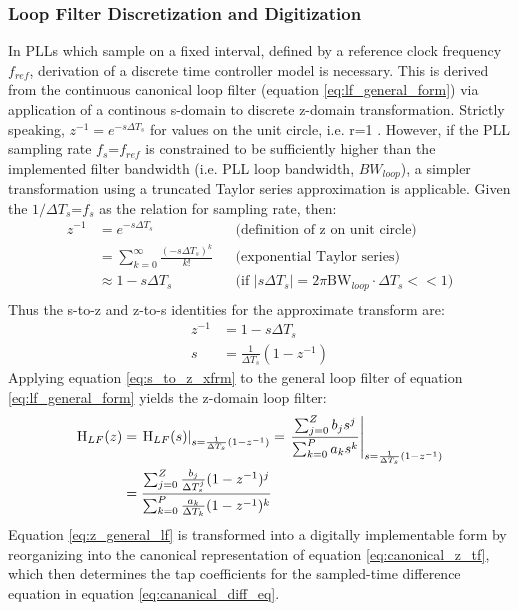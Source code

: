 		\subsubsection{Loop Filter Discretization and Digitization}\label{lf-discretization}
			In PLLs which sample on a fixed interval, defined by a reference clock frequency $f_{ref}$, derivation of a discrete time controller model is necessary. This is derived from the continuous canonical loop filter (equation \ref{eq:lf_general_form}) via application of a continous s-domain to discrete z-domain transformation. Strictly speaking, $z^{-1} = e^{-s\Delta T_s}$ for values on the unit circle, i.e. r=1 \cite{proakis_1993_z}. However, if the PLL sampling rate $f_s$=$f_{ref}$ is constrained to be sufficiently higher than the implemented filter bandwidth (i.e. PLL loop bandwidth, $BW_{loop}$), a simpler transformation using a truncated Taylor series approximation is applicable. Given the $1/\Delta T_s$=$f_{s}$ as the relation for sampling rate, then:
			\begin{align*}
				z^{-1} &= e^{-s\Delta T_s} && \text{(definition of z on unit circle)} \\
				&= \sum_{k=0}^\infty\frac{(-s\Delta T_s)^k}{k!} && \text{(exponential Taylor series)} \\
				&\approx 1-s\Delta T_s &&\text{(if $|s\Delta T_s| = 2\pi\mathrm{BW}_{loop}\cdot \Delta T_s << 1$)} \\
			\end{align*}
			Thus the s-to-z and z-to-s identities for the approximate transform are:
			\begin{align}
				z^{-1} &= 1-s\Delta T_s\\
				s &= \frac{1}{\Delta T_s}(1-z^{-1}) \label{eq:s_to_z_xfrm}
			\end{align}
			Applying equation \ref{eq:s_to_z_xfrm} to the general loop filter of equation \ref{eq:lf_general_form} yields the z-domain loop filter:
			\begin{align}
				\textnormal{H}_{LF}(z) &= \left.\textnormal{H}_{LF}(s)\right\vert_{s=\frac{1}{\Delta T_s}(1-z^{-1})} = \left.\frac{\sum_{j=0}^Z b_js^j}{\sum_{k=0}^P a_ks^k}\right\vert_{s=\frac{1}{\Delta T_s}(1-z^{-1})}\\
				&= \frac{\sum_{j=0}^Z \frac{b_j}{\Delta T_s^j}(1-z^{-1})^j}{\sum_{k=0}^P \frac{a_k}{\Delta T_k}(1-z^{-1})^k} \label{eq:z_general_lf}
			\end{align}
			Equation \ref{eq:z_general_lf} is transformed into a digitally implementable form by reorganizing into the canonical representation of equation \ref{eq:canonical_z_tf}, which then determines the tap coefficients for the sampled-time difference equation in equation \ref{eq:cananical_diff_eq}. 

